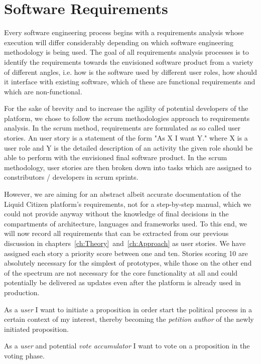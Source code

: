 \section{Software Requirements}
\label{sec:SoftwareRequirements}

Every software engineering process begins with a requirements analysis whose execution will differ considerably depending on which software engineering methodology is being used.
The goal of all requirements analysis processes is to identify the requirements towards the envisioned software product from a variety of different angles, i.e. how is the software used by different user roles, how should it interface with existing software, which of these are functional requirements and which are non-functional.

For the sake of brevity and to increase the agility of potential developers of the platform, we chose to follow the scrum methodologies approach to requirements analysis.
In the scrum method, requirements are formulated as so called user stories.
An user story is a statement of the form "As X I want Y." where X is a user role and Y is the detailed description of an activity the given role should be able to perform with the envisioned final software product.
In the scrum methodology, user stories are then broken down into tasks which are assigned to constributors / developers in scrum sprints.

However, we are aiming for an abstract albeit accurate documentation of the Liquid Citizen platform's requirements, not for a step-by-step manual, which we could not provide anyway without the knowledge of final decisions in the compartments of architecture, languages and frameworks used.
To this end, we will now record all requirements that can be extracted from our previous discussion in chapters~\ref{ch:Theory}~and~\ref{ch:Approach} as user stories.
We have assigned each story a priority score between one and ten. Stories scoring 10 are absolutely necessary for the simplest of prototypes, while those on the other end of the spectrum are not necessary for the core functionality at all and could potentially be delivered as updates even after the platform is already used in production.

As a \textit{user} I want to initiate a proposition in order start the political process in a certain context of my interest, thereby becoming the \textit{petition author} of the newly initiated proposition.

As a \textit{user} and potential \textit{vote accumulator} I want to vote on a proposition in the voting phase.

